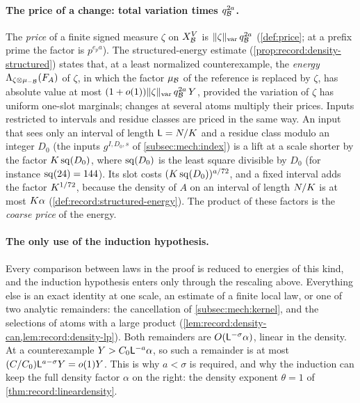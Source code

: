 \paragraph{The price of a change: total variation times $q_{\mathcal B}^{2a}$.}
The \emph{price} of a finite signed measure $\zeta$ on $X_\mathcal B^V$ is
$\|\zeta\|_{\rm var}\,q_\mathcal B^{2a}$ (\cref{def:price}; at a prefix prime the
factor is $p^{e_pa}$). The structured-energy estimate
(\cref{prop:record:density-structured}) states that, at a least normalized
counterexample, the \emph{energy} $\Lambda_{\zeta\otimes\mu_{-\mathcal B}}(F_A)$ of $\zeta$, in
which the factor $\mu_\mathcal B$ of the reference is replaced by $\zeta$, has absolute
value at most $(1+o(1))\|\zeta\|_{\rm var}\,q_\mathcal B^{2a}\,Y$, provided the variation of $\zeta$ has
uniform one-slot marginals; changes at several atoms multiply their prices.
Inputs restricted to intervals and residue classes are priced in the same
way. An input that sees only an interval of length $\mathsf L=N/K$ and a
residue class modulo an integer $D_0$ (the inputs $g^{I,D_0,s}$ of
\cref{subsec:mech:index}) is a lift at a scale shorter by the factor
$K\operatorname{sq}(D_0)$, where $\operatorname{sq}(D_0)$ is the least square divisible by $D_0$ (for
instance $\operatorname{sq}(24)=144$). Its slot costs $(K\operatorname{sq}(D_0))^{a/72}$, and a fixed
interval adds the factor $K^{1/72}$, because the density of $A$ on an
interval of length $N/K$ is at most $K\alpha$
(\cref{def:record:structured-energy}). The product of these factors is the
\emph{coarse price} of the energy.

\paragraph{The only use of the induction hypothesis.}
Every comparison between laws in the proof is reduced to energies of this
kind, and the induction hypothesis enters only through the rescaling
above. Everything else is an exact identity at one scale, an estimate of a
finite local law, or one of two analytic remainders: the cancellation of
\cref{subsec:mech:kernel}, and the selections of atoms with a large product
(\cref{lem:record:density-can,lem:record:density-lp}). Both remainders are
$O(\mathsf L^{-\sigma}\alpha)$, linear in the density. At a counterexample
$Y>C_0\mathsf L^{-a}\alpha$, so such a remainder is at most
$(C/C_0)\mathsf L^{a-\sigma}Y=o(1)Y$. This is why $a<\sigma$ is required, and why
the induction can keep the full density factor $\alpha$ on the right: the
density exponent $\theta=1$ of \cref{thm:record:lineardensity}.

